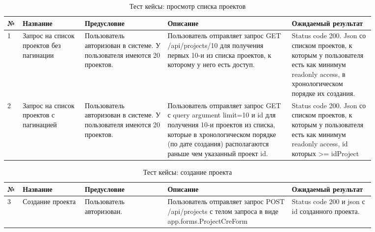 \documentclass[a4paper,12pt]{article}
\begin{document}
	\begin{table}[htb]
		\centering
		\begin{tabular}{|p{0.02\linewidth}|p{0.15\linewidth}|p{0.2\linewidth}|p{0.3\linewidth}|p{0.2\linewidth}|} 
			\hline
			\textbf{№} & \textbf{Название} & \textbf{Предусловие} & \textbf{Описание} & \textbf{Ожидаемый результат} \\ \hline
			1 & Запрос на список проектов без пагинации & Пользователь авторизован в системе. У пользователя имеются 20 проектов. & Пользователь отправляет запрос GET /api/projects/10 для получения первых 10-и из списка проектов, к которому у него есть доступ. & Status code 200. Json со списком проектов, к которым у пользователя есть как минимум readonly access, в хронологическом порядке их создания. \\ \hline
			2 & Запрос на список проектов с пагинацией & Пользователь авторизован в системе. У пользователя имеются 20 проектов. & Пользователь отправляет запрос GET с query argument limit=10 и id для получения 10-и проектов из списка, которые в хронологическом порядке (по дате создания) располагаются раньше чем указанный проект id. & Status code 200. Json со списком проектов, к которым у пользователя есть как минимум readonly access, id которых >= idProject \\ 	\hline
\end{tabular}
	\caption{Тест кейсы: просмотр списка проектов}
	\end{table}
	
\begin{table}[htb]
		\centering
		\begin{tabular}{|p{0.02\linewidth}|p{0.15\linewidth}|p{0.2\linewidth}|p{0.3\linewidth}|p{0.2\linewidth}|} 
			\hline
			\textbf{№} & \textbf{Название} & \textbf{Предусловие} & \textbf{Описание} & \textbf{Ожидаемый результат} \\ \hline
			3 & Создание проекта & Пользователь авторизован. & Пользователь отправляет запрос POST /api/projects с телом запроса в виде app.forms.ProjectCreForm &  Status code 200 и json с id созданного проекта. \\ \hline
			
\end{tabular}
	\caption{Тест кейсы: создание проекта}
	\end{table}
	
\end{document}
